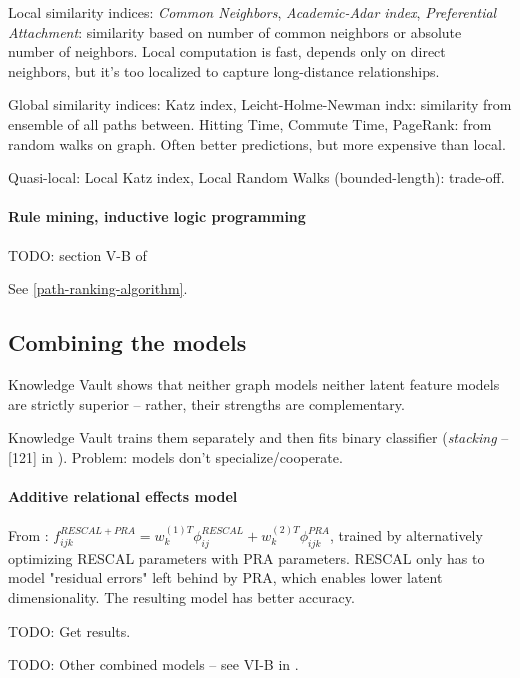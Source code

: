 Local similarity indices: \textit{Common Neighbors}, \textit{Academic-Adar
index}, \textit{Preferential Attachment}: similarity based on number of common
neighbors or absolute number of neighbors. Local computation is fast, depends
only on direct neighbors, but it's too localized to capture long-distance
relationships.

Global similarity indices: Katz index, Leicht-Holme-Newman indx: similarity from
ensemble of all paths between. Hitting Time, Commute Time, PageRank: from random
walks on graph. Often better predictions, but more expensive than local.

Quasi-local: Local Katz index, Local Random Walks (bounded-length): trade-off.

\paragraph{Rule mining, inductive logic programming}

TODO: section V-B of \cite{review-of-relational-ml-for-kgs}

See \ref{path-ranking-algorithm}.

\subsection{Combining the models}

Knowledge Vault shows that neither graph models neither latent feature models
are strictly superior -- rather, their strengths are complementary.

Knowledge Vault trains them separately and then fits binary classifier
(\textit{stacking} -- [121] in \cite{review-of-relational-ml-for-kgs}).
Problem: models don't specialize/cooperate.

\paragraph{Additive relational effects model}
From \cite{reducing-the-rank}:
$f_{ijk}^{RESCAL+PRA}=w_k^{(1)T}\phi_{ij}^{RESCAL} +
w_k^{(2)T}\phi_{ijk}^{PRA}$,
trained by alternatively optimizing RESCAL parameters with PRA parameters.
RESCAL only has to model "residual errors" left behind by PRA, which enables
lower latent dimensionality. The resulting model has better accuracy.

TODO: Get results.

TODO: Other combined models -- see VI-B in
\cite{review-of-relational-ml-for-kgs}.

